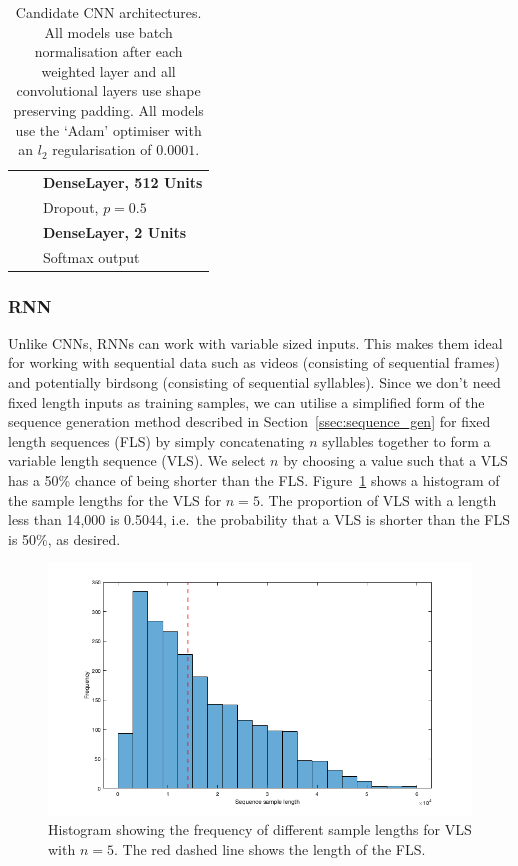 \begin{table}[hp]
\begin{center}
\begin{tabular}{l l l}
& & \textbf{DenseLayer, 512 Units} \\
& & Dropout, $p=0.5$ \\[1ex]
& & \textbf{DenseLayer, 2 Units} \\
& & Softmax output \\[1ex]
\bottomrule
\end{tabular}
\caption{Candidate CNN architectures. All models use batch normalisation after
each weighted layer and all convolutional layers use shape preserving
padding. All models use the `Adam' optimiser with an $l_2$ regularisation of
$0.0001$.}\label{table:cnn_architectures}
\end{center}
\end{table}

\subsubsection{RNN}\label{sssec:method:rnn}

Unlike CNNs, RNNs can work with variable sized inputs. This makes them ideal for
working with sequential data such as videos (consisting of sequential frames) and
potentially birdsong (consisting of sequential syllables). Since we don't need
fixed length inputs as training samples, we can utilise a simplified form of the
sequence generation method described in Section~\ref{ssec:sequence_gen} for
fixed length sequences (FLS) by simply concatenating $n$ syllables together to
form a variable length sequence (VLS). We select $n$ by choosing a value such
that a VLS has a 50\% chance of being shorter than the FLS\@.
Figure~\ref{fig:vls_lengths} shows a histogram of the sample lengths for the VLS
for $n=5$. The proportion of VLS with a length less than 14,000 is 0.5044, i.e.\
the probability that a VLS is shorter than the FLS is 50\%, as desired.

\begin{figure}[ht]
  \centering
  \includegraphics[width=\textwidth]{figures/vls_lengths.png}
  \caption{Histogram showing the frequency of different sample lengths for VLS
  with $n=5$. The red dashed line shows the length of the
FLS.}\label{fig:vls_lengths}
\end{figure}

